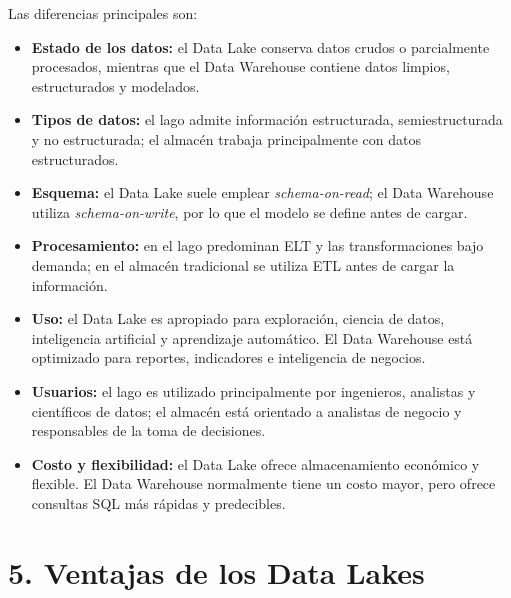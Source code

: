 Las diferencias principales son:

\begin{itemize}
    \item \textbf{Estado de los datos:} el Data Lake conserva datos crudos o
    parcialmente procesados, mientras que el Data Warehouse contiene datos
    limpios, estructurados y modelados.

    \item \textbf{Tipos de datos:} el lago admite información estructurada,
    semiestructurada y no estructurada; el almacén trabaja principalmente con
    datos estructurados.

    \item \textbf{Esquema:} el Data Lake suele emplear
    \textit{schema-on-read}; el Data Warehouse utiliza
    \textit{schema-on-write}, por lo que el modelo se define antes de cargar.

    \item \textbf{Procesamiento:} en el lago predominan ELT y las
    transformaciones bajo demanda; en el almacén tradicional se utiliza ETL
    antes de cargar la información.

    \item \textbf{Uso:} el Data Lake es apropiado para exploración, ciencia de
    datos, inteligencia artificial y aprendizaje automático. El Data Warehouse
    está optimizado para reportes, indicadores e inteligencia de negocios.

    \item \textbf{Usuarios:} el lago es utilizado principalmente por
    ingenieros, analistas y científicos de datos; el almacén está orientado a
    analistas de negocio y responsables de la toma de decisiones.

    \item \textbf{Costo y flexibilidad:} el Data Lake ofrece almacenamiento
    económico y flexible. El Data Warehouse normalmente tiene un costo mayor,
    pero ofrece consultas SQL más rápidas y predecibles.
\end{itemize}

\section*{5. Ventajas de los Data Lakes}

